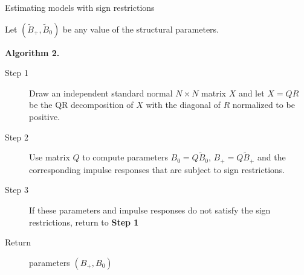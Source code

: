 \documentclass[notes,blackandwhite,mathsans,usenames,dvipsnames]{beamer}
\begin{document}
\begin{frame}{Estimating models with sign restrictions}

{\color{mcxs2}Let} $(\tilde{B}_+,\tilde{B}_0)$ {\color{mcxs2}be any value of the structural parameters.}

\bigskip\textbf{Algorithm 2.}\small
\begin{description}
\item[Step 1] {\color{mcxs2}Draw an independent standard normal} $N\times N$ {\color{mcxs2}matrix} $X$ {\color{mcxs2}and let} $X=QR$ {\color{mcxs2}be the QR decomposition of} $X$ {\color{mcxs2}with the diagonal of $R$ normalized to be positive.}

\item[Step 2] {\color{mcxs2}Use matrix} $Q$ {\color{mcxs2}to compute parameters} $B_0 = Q\tilde{B}_0$, $B_+=Q\tilde{B}_+$ {\color{mcxs2}and the corresponding impulse responses that are subject to sign restrictions.}

\item[Step 3] {\color{mcxs2}If these parameters and impulse responses do not satisfy the sign restrictions, return to} \textbf{Step 1 }

\item[Return] {\color{mcxs2}parameters} $(B_+,B_0)$ 
\end{description}

\end{frame}
\end{document}
